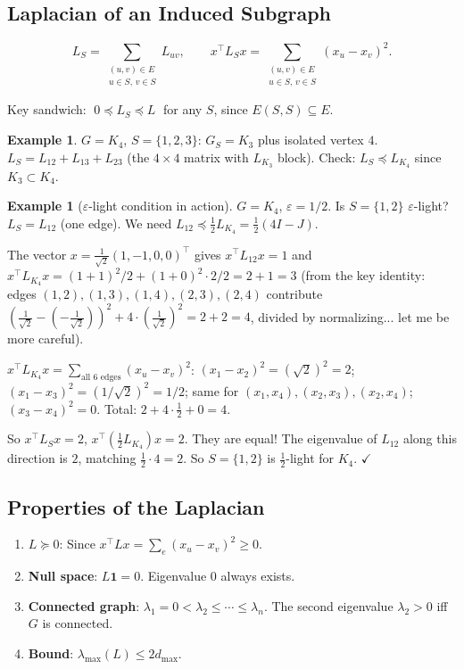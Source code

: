 \documentclass[12pt]{article}
\theoremstyle{definition}
\newtheorem{example}[theorem]{Example}
\theoremstyle{remark}
\begin{document}
\subsection{Laplacian of an Induced Subgraph}

\[
  L_S = \sum_{\substack{(u,v)\in E \\ u\in S,\, v\in S}} L_{uv},
  \qquad
  x^\top L_S x = \sum_{\substack{(u,v)\in E \\ u\in S,\, v\in S}} (x_u - x_v)^2.
\]

Key sandwich: $\; 0 \preceq L_S \preceq L \;$ for any $S$, since $E(S,S) \subseteq E$.

\begin{example}
$G = K_4$, $S = \{1,2,3\}$:
$G_S = K_3$ plus isolated vertex $4$.
$L_S = L_{12}+L_{13}+L_{23}$ (the $4\times4$ matrix with $L_{K_3}$ block).
Check: $L_S \preceq L_{K_4}$ since $K_3 \subset K_4$.
\end{example}

\begin{example}[$\varepsilon$-light condition in action]
$G = K_4$, $\varepsilon = 1/2$.  Is $S = \{1,2\}$ $\varepsilon$-light?
$L_S = L_{12}$ (one edge).  We need $L_{12} \preceq \frac{1}{2} L_{K_4} = \frac{1}{2}(4I-J)$.

The vector $x = \frac{1}{\sqrt2}(1,-1,0,0)^\top$ gives
$x^\top L_{12} x = 1$ and $x^\top L_{K_4} x = (1+1)^2/2 + (1+0)^2 \cdot 2/2 = 2+1 = 3$
(from the key identity: edges $(1,2),(1,3),(1,4),(2,3),(2,4)$ contribute
$(\frac{1}{\sqrt2}-(-\frac{1}{\sqrt2}))^2 + 4\cdot(\frac{1}{\sqrt2})^2 = 2 + 2 = 4$,
divided by normalizing... let me be more careful).

$x^\top L_{K_4} x = \sum_{\text{all 6 edges}} (x_u - x_v)^2$:
$(x_1-x_2)^2 = (\sqrt2)^2 = 2$;
$(x_1-x_3)^2 = (1/\sqrt2)^2 = 1/2$; same for $(x_1,x_4),(x_2,x_3),(x_2,x_4)$;
$(x_3-x_4)^2 = 0$.
Total: $2 + 4\cdot\frac{1}{2} + 0 = 4$.

So $x^\top L_S x = 2$, $x^\top(\frac{1}{2} L_{K_4})x = 2$. They are equal!
The eigenvalue of $L_{12}$ along this direction is $2$, matching $\frac{1}{2}\cdot 4 = 2$.
So $S = \{1,2\}$ is $\frac{1}{2}$-light for $K_4$. $\checkmark$
\end{example}

\subsection{Properties of the Laplacian}

\begin{enumerate}
  \item \textbf{$L \succeq 0$}: Since $x^\top Lx = \sum_e(x_u-x_v)^2 \ge 0$.
  \item \textbf{Null space}: $L\mathbf{1} = 0$.  Eigenvalue 0 always exists.
  \item \textbf{Connected graph}: $\lambda_1 = 0 < \lambda_2 \le \cdots \le \lambda_n$.
        The second eigenvalue $\lambda_2 > 0$ iff $G$ is connected.
  \item \textbf{Bound}: $\lambda_{\max}(L) \le 2d_{\max}$.
\end{enumerate}
\end{document}
